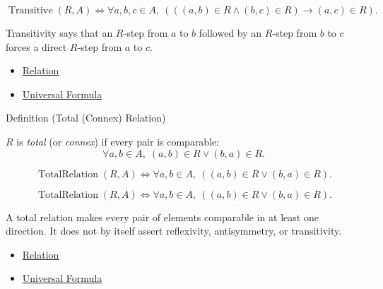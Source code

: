 \begin{remark*}
\[
  \operatorname{Transitive}(R,A)
  \iff
  \forall a,b,c\in A,\ (((a,b)\in R\land(b,c)\in R)\to(a,c)\in R).
\]
\end{remark*}

\begin{remark*}[Interpretation]
Transitivity says that an $R$-step from $a$ to $b$ followed by an $R$-step
from $b$ to $c$ forces a direct $R$-step from $a$ to $c$.
\end{remark*}

\begin{dependencies}
\begin{itemize}
  \item \hyperref[def:relation]{Relation}
  \item \hyperref[def:universal-q]{Universal Formula}
\end{itemize}
\end{dependencies}

\begin{definitionbox}{Definition (Total (Connex) Relation)}
\begin{definition}\label{def:total-rel}
$R$ is \emph{total} (or \emph{connex}) if every pair is comparable:
\[
\forall a,b \in A, \;
(a,b) \in R \lor (b,a) \in R.
\]
\end{definition}
\end{definitionbox}

\begin{remark*}
\[
  \operatorname{TotalRelation}(R,A)
  \iff
  \forall a,b \in A,\ ((a,b)\in R \lor (b,a)\in R).
\]
\end{remark*}

\begin{remark*}
\[
  \operatorname{TotalRelation}(R,A)
  \iff
  \forall a,b \in A,\ ((a,b)\in R \lor (b,a)\in R).
\]
\end{remark*}

\begin{remark*}[Interpretation]
A total relation makes every pair of elements comparable in at least one
direction. It does not by itself assert reflexivity, antisymmetry, or
transitivity.
\end{remark*}

\begin{dependencies}
\begin{itemize}
  \item \hyperref[def:relation]{Relation}
  \item \hyperref[def:universal-q]{Universal Formula}
\end{itemize}
\end{dependencies}

